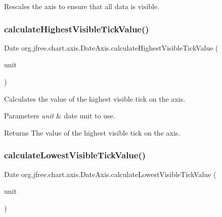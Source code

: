 Rescales the axis to ensure that all data is visible. \mbox{\label{classorg_1_1jfree_1_1chart_1_1axis_1_1_date_axis_a203345960a90a09866979c930de7e1a0}} 
\subsubsection{\texorpdfstring{calculate\+Highest\+Visible\+Tick\+Value()}{calculateHighestVisibleTickValue()}}
{\footnotesize\ttfamily Date org.\+jfree.\+chart.\+axis.\+Date\+Axis.\+calculate\+Highest\+Visible\+Tick\+Value (\begin{DoxyParamCaption}\item[{\mbox{\hyperlink{classorg_1_1jfree_1_1chart_1_1axis_1_1_date_tick_unit}{Date\+Tick\+Unit}}}]{unit }\end{DoxyParamCaption})}

Calculates the value of the highest visible tick on the axis.


\begin{DoxyParams}{Parameters}
{\em unit} & date unit to use.\\
\hline
\end{DoxyParams}
\begin{DoxyReturn}{Returns}
The value of the highest visible tick on the axis. 
\end{DoxyReturn}
\mbox{\label{classorg_1_1jfree_1_1chart_1_1axis_1_1_date_axis_a184849ce6ba78db3e925df10b28f3c0a}} 
\subsubsection{\texorpdfstring{calculate\+Lowest\+Visible\+Tick\+Value()}{calculateLowestVisibleTickValue()}}
{\footnotesize\ttfamily Date org.\+jfree.\+chart.\+axis.\+Date\+Axis.\+calculate\+Lowest\+Visible\+Tick\+Value (\begin{DoxyParamCaption}\item[{\mbox{\hyperlink{classorg_1_1jfree_1_1chart_1_1axis_1_1_date_tick_unit}{Date\+Tick\+Unit}}}]{unit }\end{DoxyParamCaption})}

